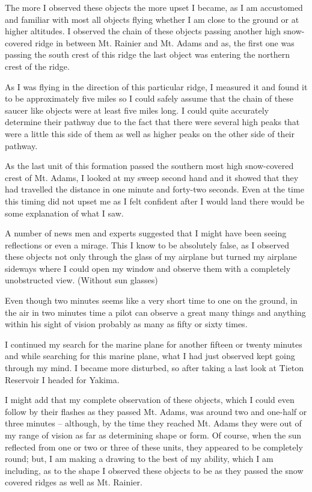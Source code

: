\begin{svgraybox}
      The more I observed these objects the more upset I became, as I am accustomed and familiar with most all objects flying whether I am close
to the ground or at higher altitudes. I observed the chain of these objects passing another high snow-covered ridge in between Mt. Rainier and Mt. Adams
      and as, the first one was passing the south crest of this ridge the last object was entering the northern crest of the ridge.

      As I was flying in the direction of this particular ridge, I measured it and found it to be approximately five miles so I could safely assume that the chain of these saucer like objects were at least five miles long. I could quite accurately determine their pathway due to the fact that there were several high peaks that were a little this side of them as well as higher peaks on the other side of their pathway.

      As the last unit of this formation passed the southern most high snow-covered crest of Mt. Adams, I looked at my sweep second hand and it showed that they had travelled the distance in one minute and forty-two seconds. Even at the time this timing did not upset me as I felt confident after I would land there would be some explanation of what I saw.

      A number of news men and experts suggested that I might have been seeing reflections or even a mirage. This I know to be absolutely false, as I observed these objects not only through the glass of my airplane but turned my airplane sideways where I could open my window and observe them with a completely unobstructed view. (Without sun glasses)

      Even though two minutes seems like a very short time to one on the ground, in the air in two minutes time a pilot can observe a great many things and anything within his sight of vision probably as many as fifty or sixty times.

      I continued my search for the marine plane for another fifteen or twenty minutes and while searching for this marine plane, what I had just observed kept going through my mind. I became more disturbed, so after taking a last look at Tieton Reservoir I headed for Yakima.

      I might add that my complete observation of these objects, which I could even follow by their flashes as they passed Mt. Adams, was around two
      and one-half or three minutes -- although, by the time they reached Mt. Adams they were out of my range of vision as far as determining shape or form. Of course, when the sun reflected from one or two or three of these units, they appeared to be completely round; but, I am making a drawing to the best of my ability, which I am including, as to the shape I observed these objects to be as they passed the snow covered ridges as well as Mt. Rainier.


\end{svgraybox}
